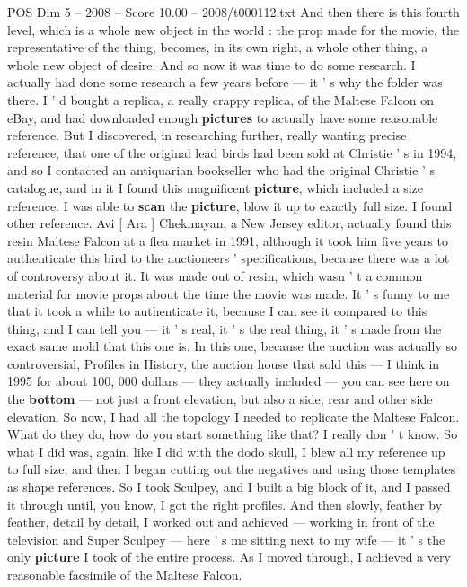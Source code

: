 \begin{textsample}{POS Dim 5 – 2008 – Score 10.00 – 2008/t000112.txt}
And then there is this fourth level, which is a whole new object in the world : the prop made for the movie, the representative of the thing, becomes, in its own right, a whole other thing, a whole new object of desire.
And so now it was time to do some research.
I actually had done some research a few years before — it ' s why the folder was there.
I ' d bought a replica, a really crappy replica, of the Maltese Falcon on eBay, and had downloaded enough \textbf{pictures} to actually have some reasonable reference.
But I discovered, in researching further, really wanting precise reference, that one of the original lead birds had been sold at Christie ' s in 1994, and so I contacted an antiquarian bookseller who had the original Christie ' s catalogue, and in it I found this magnificent \textbf{picture}, which included a size reference.
I was able to \textbf{scan} the \textbf{picture}, blow it up to exactly full size.
I found other reference.
Avi [ Ara ] Chekmayan, a New Jersey editor, actually found this resin Maltese Falcon at a flea market in 1991, although it took him five years to authenticate this bird to the auctioneers ' specifications, because there was a lot of controversy about it.
It was made out of resin, which wasn ' t a common material for movie props about the time the movie was made.
It ' s funny to me that it took a while to authenticate it, because I can see it compared to this thing, and I can tell you — it ' s real, it ' s the real thing, it ' s made from the exact same mold that this one is.
In this one, because the auction was actually so controversial, Profiles in History, the auction house that sold this — I think in 1995 for about 100, 000 dollars — they actually included — you can see here on the \textbf{bottom} — not just a front elevation, but also a side, rear and other side elevation.
So now, I had all the topology I needed to replicate the Maltese Falcon.
What do they do, how do you start something like that?
I really don ' t know.
So what I did was, again, like I did with the dodo skull, I blew all my reference up to full size, and then I began cutting out the negatives and using those templates as shape references.
So I took Sculpey, and I built a big block of it, and I passed it through until, you know, I got the right profiles.
And then slowly, feather by feather, detail by detail, I worked out and achieved — working in front of the television and Super Sculpey — here ' s me sitting next to my wife — it ' s the only \textbf{picture} I took of the entire process.
As I moved through, I achieved a very reasonable facsimile of the Maltese Falcon.

\end{textsample}
